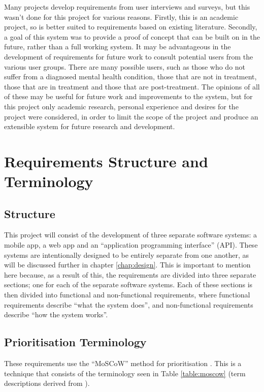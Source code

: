 \documentclass[11pt,openright,a4paper]{report}
\begin{document}
Many projects develop requirements from user interviews and surveys, but this wasn't done for this project for various reasons. Firstly, this is an academic project, so is better suited to requirements based on existing literature. Secondly, a goal of this system was to provide a proof of concept that can be built on in the future, rather than a full working system. It may be  advantageous in the development of requirements for future work to consult potential users from the various user groups. There are many possible users, such as those who do not suffer from a diagnosed mental health condition, those that are not in treatment, those that are in treatment and those that are post-treatment. The opinions of all of these may be useful for future work and improvements to the system, but for this project only academic research, personal experience and desires for the project were considered, in order to limit the scope of the project and produce an extensible system for future research and development.

\section{Requirements Structure and Terminology}
\subsection{Structure}
This project will consist of the development of three separate software systems: a mobile app, a web app and an \enquote{application programming interface} (API). These systems are intentionally designed to be entirely separate from one another, as will be discussed further in chapter \ref{chap:design}. This is important to mention here because, as a result of this, the requirements are divided into three separate sections; one for each of the separate software systems. Each of these sections is then divided into functional and non-functional requirements, where functional requirements describe \enquote{what the system does}, and non-functional requirements describe \enquote{how the system works}.

\subsection{Prioritisation Terminology}
These requirements use the \enquote{MoSCoW} method for prioritisation \parencite{moscowmethod}. This is a technique that consists of the terminology seen in Table \ref{table:moscow} (term descriptions derived from \parencite{moscowmethod}).
\end{document}
